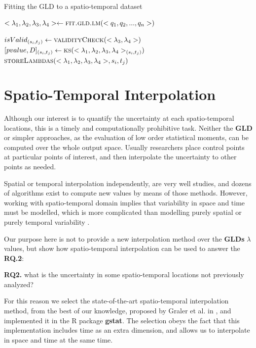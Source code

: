 \begin{algorithm} 
\caption{Fitting the GLD to a spatio-temporal dataset}\label{alg:fitGLD}
\begin{algorithmic}[1] 
\State $<\lambda_{1},\lambda_{2},\lambda_{3},\lambda_{4}> \gets \Call {fit.gld.lm}{<q_1,q_2,...,q_n>}$

\State $isValid_{(s_{i},t_{j})} \gets \Call {validityCheck}{<\lambda_{3},\lambda_{4}>}$
\State $[pvalue,D]_{(s_{i},t_{j})} \gets \Call{ks}{<\lambda_{1},\lambda_{2},\lambda_{3},\lambda_{4}>_{(s_{i},t_{j})}}$
\EndIf
{}
\State $\Call{storeLambdas}{<\lambda_{1},\lambda_{2},\lambda_{3},\lambda_{4}>,s_{i},t_{j}}$
\EndIf
\EndFunction 
\end{algorithmic} 
\end{algorithm} 

\section{Spatio-Temporal Interpolation}\label{sec:kriging}
Although our interest is to quantify the uncertainty at each spatio-temporal locations, this is a timely and computationally prohibitive task. Neither the \textbf{GLD} or simpler approaches, as the evaluation of low order statistical moments, can be computed over the whole output space. Usually researchers place control points at particular points of interest, and then interpolate the uncertainty to other points as needed.

Spatial or temporal interpolation independently, are very well studies, and dozens of algorithms exist to compute new values by means of those methods. However, working with spatio-temporal domain implies that variability in space and time must be modelled, which is more complicated than modelling purely spatial or purely temporal variability \cite{Graler2016}.

Our purpose here is not to provide a new interpolation method over the \textbf{GLDs} $\lambda$ values, but show how spatio-temporal interpolation can be used to answer the \textbf{RQ.2}:
\begin{tcolorbox}
\textbf{RQ2.} what is the uncertainty in some spatio-temporal locations not previously analyzed?
\end{tcolorbox}

For this reason we select the state-of-the-art spatio-temporal interpolation method, from the best of our knowledge, proposed by Graler et al. in \cite{Graler2016}, and implemented it in the R package \textbf{gstat}. The selection obeys the fact that this implementation includes time as an extra dimension, and allows us to interpolate in space and time at the same time.

